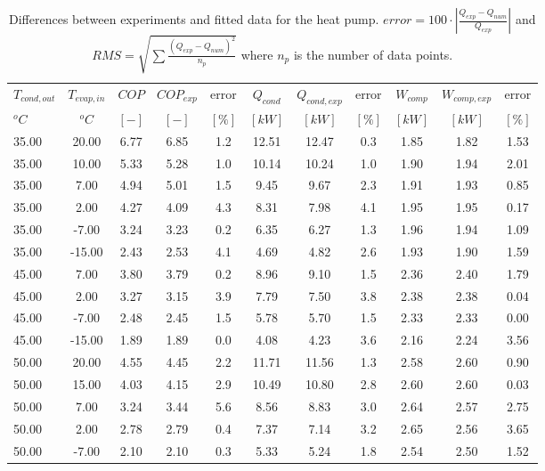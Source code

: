 \documentclass[english]{SPFShortReport}
\begin{document}
\begin{table}[!ht]
\begin{small}
\caption{Differences between experiments and fitted data for the heat pump.          $error=100 \cdot |\frac{Q_{exp}-Q_{num}}{Q_{exp}}|$ and $RMS = \sqrt { \sum{\frac{(Q_{exp}-Q_{num})^2}{n_p}} }$ where $n_p$ is the number of data points.}
\begin{center}
\resizebox{12cm}{!} 
{
\begin{tabular}{l | c c c c c c c c c c } 
\hline
\hline
$T_{cond,out}$ &$T_{evap,in}$ &$COP$ &$COP_{exp}$ &error &$Q_{cond}$ &$Q_{cond,exp}$ &error &$W_{comp}$ &$W_{comp,exp}$ &error \\ 
$^oC$ &$^oC$ &$[-]$ &$[-]$ &$[\%]$ &$[kW]$ &$[kW]$ &$[\%]$ &$[kW]$ &$[kW]$ &$[\%]$\\ 
\hline
35.00  & 20.00 & 6.77 & 6.85 & 1.2 & 12.51 & 12.47 & 0.3 & 1.85 & 1.82 & 1.53\\ 
35.00  & 10.00 & 5.33 & 5.28 & 1.0 & 10.14 & 10.24 & 1.0 & 1.90 & 1.94 & 2.01\\ 
35.00  & 7.00 & 4.94 & 5.01 & 1.5 & 9.45 & 9.67 & 2.3 & 1.91 & 1.93 & 0.85\\ 
35.00  & 2.00 & 4.27 & 4.09 & 4.3 & 8.31 & 7.98 & 4.1 & 1.95 & 1.95 & 0.17\\ 
35.00  & -7.00 & 3.24 & 3.23 & 0.2 & 6.35 & 6.27 & 1.3 & 1.96 & 1.94 & 1.09\\ 
35.00  & -15.00 & 2.43 & 2.53 & 4.1 & 4.69 & 4.82 & 2.6 & 1.93 & 1.90 & 1.59\\ 
45.00  & 7.00 & 3.80 & 3.79 & 0.2 & 8.96 & 9.10 & 1.5 & 2.36 & 2.40 & 1.79\\ 
45.00  & 2.00 & 3.27 & 3.15 & 3.9 & 7.79 & 7.50 & 3.8 & 2.38 & 2.38 & 0.04\\ 
45.00  & -7.00 & 2.48 & 2.45 & 1.5 & 5.78 & 5.70 & 1.5 & 2.33 & 2.33 & 0.00\\ 
45.00  & -15.00 & 1.89 & 1.89 & 0.0 & 4.08 & 4.23 & 3.6 & 2.16 & 2.24 & 3.56\\ 
50.00  & 20.00 & 4.55 & 4.45 & 2.2 & 11.71 & 11.56 & 1.3 & 2.58 & 2.60 & 0.90\\ 
50.00  & 15.00 & 4.03 & 4.15 & 2.9 & 10.49 & 10.80 & 2.8 & 2.60 & 2.60 & 0.03\\ 
50.00  & 7.00 & 3.24 & 3.44 & 5.6 & 8.56 & 8.83 & 3.0 & 2.64 & 2.57 & 2.75\\ 
50.00  & 2.00 & 2.78 & 2.79 & 0.4 & 7.37 & 7.14 & 3.2 & 2.65 & 2.56 & 3.65\\ 
50.00  & -7.00 & 2.10 & 2.10 & 0.3 & 5.33 & 5.24 & 1.8 & 2.54 & 2.50 & 1.52\\ 

\end{tabular}}
\end{center}
\end{small}
\end{table}
\end{document}
